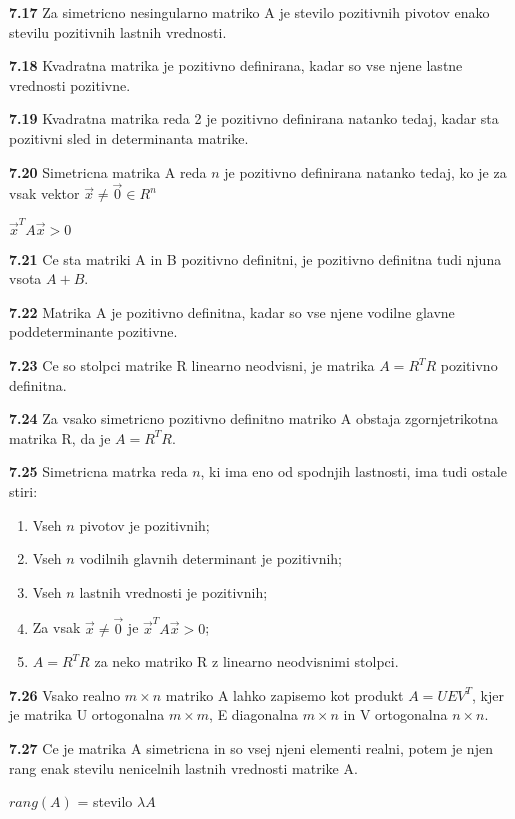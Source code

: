 \documentclass{article}
\begin{document}
\begin{multicols}{2}
\textbf{7.17} Za simetricno nesingularno matriko A je stevilo pozitivnih pivotov enako
stevilu pozitivnih lastnih vrednosti.

\textbf{7.18} Kvadratna matrika je pozitivno definirana, kadar so vse njene lastne vrednosti pozitivne.

\textbf{7.19} Kvadratna matrika reda 2 je pozitivno definirana natanko tedaj, kadar sta
pozitivni sled in determinanta matrike.

\textbf{7.20} Simetricna matrika A reda $n$ je pozitivno definirana natanko tedaj, ko je za vsak
vektor $\vec{x} \neq \vec{0} \in R^{n}$
\begin{center}
	$\vec{x}^{T}A\vec{x} > 0$
\end{center}

\textbf{7.21} Ce sta matriki A in B pozitivno definitni, je pozitivno definitna tudi
njuna vsota $A + B$.

\textbf{7.22} Matrika A je pozitivno definitna, kadar so vse njene vodilne glavne poddeterminante pozitivne.

\textbf{7.23} Ce so stolpci matrike R linearno neodvisni, je matrika $A = R^{T}R$ pozitivno definitna.

\textbf{7.24} Za vsako simetricno pozitivno definitno matriko A obstaja zgornjetrikotna matrika R, da
je $A = R^{T}R$.

\textbf{7.25} Simetricna matrka reda $n$, ki ima eno od spodnjih lastnosti, ima tudi ostale stiri:
\begin{enumerate}
	\item Vseh $n$ pivotov je pozitivnih;
	\item Vseh $n$ vodilnih glavnih determinant je pozitivnih;
	\item Vseh $n$ lastnih vrednosti je pozitivnih;
	\item Za vsak $\vec{x} \neq \vec{0}$ je $\vec{x}^{T}A\vec{x} > 0$;
	\item $A= R^{T}R$ za neko matriko R z linearno neodvisnimi stolpci.
\end{enumerate}

\textbf{7.26} Vsako realno $m \times n$ matriko A lahko zapisemo kot produkt
$A = UEV^{T}$, kjer je matrika U ortogonalna $m \times m$, E diagonalna $m \times n$ in
V ortogonalna $n \times n$.

\textbf{7.27} Ce je  matrika A simetricna in so vsej njeni elementi realni, potem je njen rang enak stevilu nenicelnih lastnih
vrednosti matrike A.
\begin{center}
	$rang(A)$ = stevilo $\lambda A$
\end{center}


\end{multicols}
\end{document}
